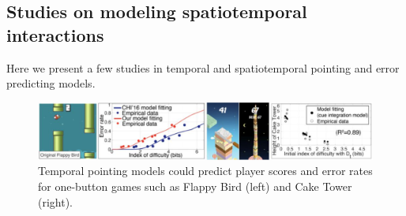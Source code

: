 \documentclass[manuscript,screen]{acmart}
\begin{document}
\subsection{Studies on modeling spatiotemporal interactions}
Here we present a few studies in temporal and spatiotemporal pointing and error predicting models. 

\begin{figure}[t]
\centering
 \includegraphics[width=12cm]{figures/flappybird.png}
    \caption{Temporal pointing models could predict player scores and error rates for one-button games such as Flappy Bird (left) and Cake Tower (right).
    }\label{fig:flappybird}
\end{figure}
\end{document}
